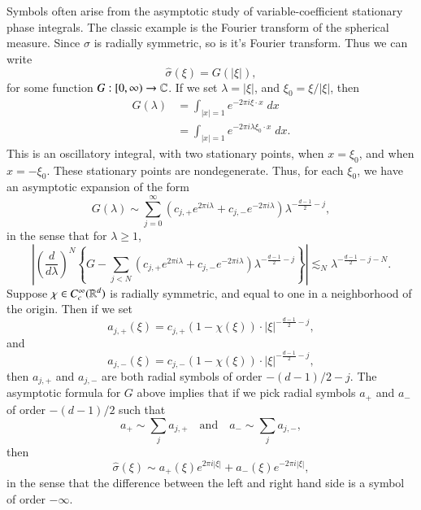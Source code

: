 \begin{example}
    Symbols often arise from the asymptotic study of variable-coefficient stationary phase integrals. The classic example is the Fourier transform of the spherical measure. Since $\sigma$ is radially symmetric, so is it's Fourier transform. Thus we can write
    \[ \widehat{\sigma}(\xi) = G(|\xi|), \]
    for some function $G: [0,\infty) \to \operatorname{\mathbb{C}}$. If we set $\lambda = |\xi|$, and $\xi_0 = \xi / |\xi|$, then
    \begin{align*}
        G(\lambda) &= \int_{|x| = 1} e^{-2 \pi i \xi \cdot x}\; dx\\
        &= \int_{|x| = 1} e^{- 2 \pi i \lambda \xi_0 \cdot x}\; dx.
    \end{align*}
    This is an oscillatory integral, with two stationary points, when $x = \xi_0$, and when $x = - \xi_0$. These stationary points are nondegenerate. Thus, for each $\xi_0$, we have an asymptotic expansion of the form
    \[ G(\lambda) \sim \sum_{j = 0}^\infty \left( c_{j,+} e^{2 \pi i \lambda} + c_{j,-} e^{- 2 \pi i \lambda} \right) \lambda^{- \frac{d-1}{2} - j}, \]
    in the sense that for $\lambda \geq 1$,
    \[ \left| \left( \frac{d}{d\lambda} \right)^N \left\{ G - \sum_{j < N} (c_{j,+} e^{2 \pi i \lambda} + c_{j,-} e^{-2 \pi i \lambda} ) \lambda^{- \frac{d-1}{2} - j} \right\} \right| \lesssim_N \lambda^{- \frac{d-1}{2} - j - N}. \]
    Suppose $\chi \in C_c^\infty(\operatorname{\mathbb{R}}^d)$ is radially symmetric, and equal to one in a neighborhood of the origin. Then if we set
    \[ a_{j,+}(\xi) = c_{j,+} (1 - \chi(\xi)) \cdot |\xi|^{- \frac{d-1}{2} - j}, \]
    and
    \[ a_{j,-}(\xi) = c_{j,-} (1 - \chi(\xi)) \cdot |\xi|^{- \frac{d-1}{2} - j}, \]
    then $a_{j,+}$ and $a_{j,-}$ are both radial symbols of order $- (d-1)/2 - j$. The asymptotic formula for $G$ above implies that if we pick radial symbols $a_+$ and $a_-$ of order $-(d-1)/2$ such that
    \[ a_+ \sim \sum_j a_{j,+} \quad\text{and}\quad a_- \sim \sum_j a_{j,-}, \]
    then
    \[ \widehat{\sigma}(\xi) \sim a_+(\xi) e^{2 \pi i |\xi|} + a_-(\xi) e^{- 2 \pi i |\xi|}, \]
    in the sense that the difference between the left and right hand side is a symbol of order $-\infty$.

\end{example}
